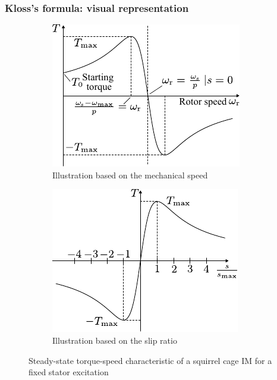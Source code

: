 \begin{frame}
	\frametitle{Kloss's formula: visual representation}
	\begin{figure}
		\centering
		\begin{subfigure}{0.49\textwidth}
			\centering
			\includegraphics[height=0.65\textheight]{fig/lec06/Kloss_formula_speed.pdf}
			\caption{Illustration based on the mechanical speed}
		\end{subfigure}
		\hfill
		\begin{subfigure}{0.49\textwidth}
			\centering
			\includegraphics[height=0.65\textheight]{fig/lec06/Kloss_formula_slip.pdf}
			\caption{Illustration based on the slip ratio}
		\end{subfigure}
        \caption{Steady-state torque-speed characteristic of a squirrel cage IM for a fixed stator excitation} 
        \label{fig:Kloss_formula}
	\end{figure}
\end{frame}

